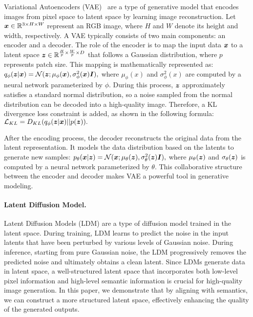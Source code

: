 Variational Autoencoders (VAE)~\cite{doersch2016tutorial} are a type of generative model that encodes images from pixel space to latent space by learning image reconstruction.
Let  ${\bm{x}} \in {\mathbb{R}}^{3 \times H \times W}$ represent an RGB image, where \(H\) and \(W\) denote its height and width, respectively. A VAE typically consists of two main components: an encoder and a decoder. The role of the encoder is to map the input data \({\bm{x}}\) to a latent space \({\bm{z}} \in {\mathbb{R}}^{\frac{H}{p} \times \frac{W}{p} \times D}\) that follows a Gaussian distribution, where \(p\) represents patch size. This mapping is mathematically represented as:
$q_\phi({\bm{z}}|{\bm{x}}) = \mathcal{N}({\bm{z}}; \mu_\phi({\bm{x}}), \sigma^2_\phi({\bm{x}}) {\bm{I}}) , $
where \(\mu_\phi(x)\) and \(\sigma^2_\phi(x)\) are computed by a neural network parameterized by \(\phi\). 
During this process, \({\bm{z}}\) approximately satisfies a standard normal distribution, so a noise sampled from the normal distribution can be decoded into a high-quality image.
Therefore, a KL divergence loss constraint is added, as shown in the following formula:
$\mathcal{L}_{KL} = D_{KL}(q_\phi({\bm{z}}|{\bm{x}}) || p({\bm{z}})).$


After the encoding process, the decoder reconstructs the original data from the latent representation. It models the data distribution based on the latents to generate new samples:%
$p_\theta({\bm{x}}|{\bm{z}}) = \mathcal{N}({\bm{x}}; \mu_\theta({\bm{z}}), \sigma^2_\theta({\bm{z}}) {\bm{I}}) , $
where \(\mu_\theta({\bm{z}})\) and \(\sigma_\theta({\bm{z}})\) is computed by a neural network parameterized by \(\theta\). This collaborative structure between the encoder and decoder makes VAE a powerful tool in generative modeling.

\paragraph{Latent Diffusion Model.} 

Latent Diffusion Models (LDM) are a type of diffusion model trained in the latent space.
During training, LDM learns to predict the noise in the input latents that have been perturbed by various levels of Gaussian noise. During inference, starting from pure Gaussian noise, the LDM progressively removes the predicted noise and ultimately obtains a clean latent.
Since LDMs generate data in latent space, a well-structured latent space that incorporates both low-level pixel information and high-level semantic information is crucial for high-quality image generation.
In this paper, we demonstrate that by aligning with semantics, we can construct a more structured latent space, effectively enhancing the quality of the generated outputs.

